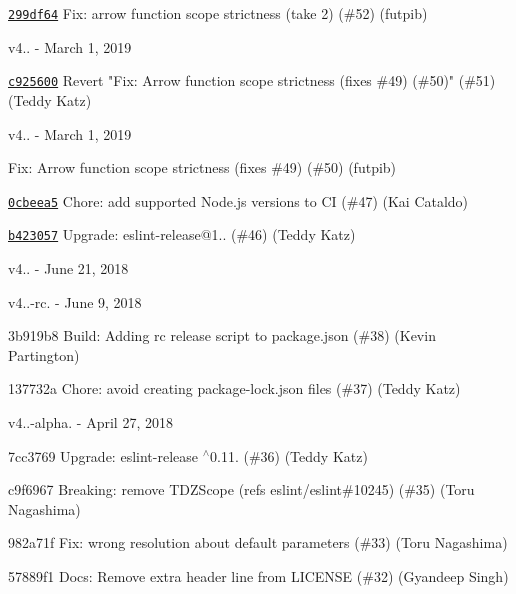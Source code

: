 \begin{DoxyItemize}
\item \href{https://github.com/eslint/eslint-scope/commit/299df64bdafb30b4d9372e4b7af0cf51a3818c4a}{\texttt{ {\ttfamily 299df64}}} Fix\+: arrow function scope strictness (take 2) (\#52) (futpib)
\end{DoxyItemize}

v4.. -\/ March 1, 2019


\begin{DoxyItemize}
\item \href{https://github.com/eslint/eslint-scope/commit/c925600a684ae0f71b96f85339437a43b4d50d99}{\texttt{ {\ttfamily c925600}}} Revert "{}\+Fix\+: Arrow function scope strictness (fixes \#49) (\#50)"{} (\#51) (Teddy Katz)
\end{DoxyItemize}

v4.. -\/ March 1, 2019


\begin{DoxyItemize}
\item \href{https://github.com/eslint/eslint-scope/commit/2533966faf317df5a3847fab937ba462c16808b8}{\texttt{ {}}} Fix\+: Arrow function scope strictness (fixes \#49) (\#50) (futpib)
\item \href{https://github.com/eslint/eslint-scope/commit/0cbeea51dfb66ab88ea34b0e3b4ad5e6cc210f2f}{\texttt{ {\ttfamily 0cbeea5}}} Chore\+: add supported Node.\+js versions to CI (\#47) (Kai Cataldo)
\item \href{https://github.com/eslint/eslint-scope/commit/b42305760638b8edf4667acf1445e450869bd983}{\texttt{ {\ttfamily b423057}}} Upgrade\+: eslint-\/release@1.. (\#46) (Teddy Katz)
\end{DoxyItemize}

v4.. -\/ June 21, 2018

v4..-\/rc. -\/ June 9, 2018


\begin{DoxyItemize}
\item 3b919b8 Build\+: Adding rc release script to package.\+json (\#38) (Kevin Partington)
\item 137732a Chore\+: avoid creating package-\/lock.\+json files (\#37) (Teddy Katz)
\end{DoxyItemize}

v4..-\/alpha. -\/ April 27, 2018


\begin{DoxyItemize}
\item 7cc3769 Upgrade\+: eslint-\/release \texorpdfstring{$^\wedge$}{\string^}0.11. (\#36) (Teddy Katz)
\item c9f6967 Breaking\+: remove TDZScope (refs eslint/eslint\#10245) (\#35) (Toru Nagashima)
\item 982a71f Fix\+: wrong resolution about default parameters (\#33) (Toru Nagashima)
\item 57889f1 Docs\+: Remove extra header line from LICENSE (\#32) (Gyandeep Singh)
\end{DoxyItemize}

